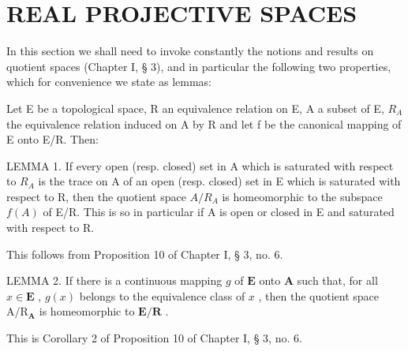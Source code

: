 \section{REAL PROJECTIVE SPACES}

In this section we shall need to invoke constantly the notions and results on quotient spaces (Chapter I, § 3), and in particular the following two properties, which for convenience we state as lemmas:

Let E be a topological space, R an equivalence relation on E, A a subset of E, \(R_{A}\) the equivalence relation induced on A by R and let f be the canonical mapping of E onto E/R. Then:

LEMMA 1. If every open (resp. closed) set in A which is saturated with respect to \(R_{A}\) is the trace on A of an open (resp. closed) set in E which is saturated with respect to R, then the quotient space \(A/R_{A}\) is homeomorphic to the subspace \(f(A)\) of E/R. This is so in particular if A is open or closed in E and saturated with respect to R.

This follows from Proposition 10 of Chapter I, § 3, no. 6.

LEMMA 2. If there is a continuous mapping \(g\) of \(\mathbf{E}\) onto \(\mathbf{A}\) such that, for all \(x \in \mathbf{E}\) , \(g(x)\) belongs to the equivalence class of \(x\) , then the quotient space \(\mathrm{A} / \mathrm{R}_{\mathbf{A}}\) is homeomorphic to \(\mathbf{E} / \mathbf{R}\) .

This is Corollary 2 of Proposition 10 of Chapter I, § 3, no. 6.

